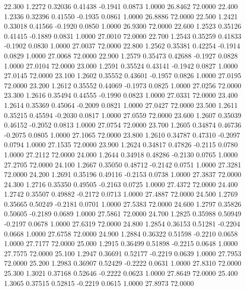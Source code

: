   22.300   1.2272   0.32036   0.41438  -0.1941   0.0873   1.0000  26.8462  72.0000
  22.400   1.2336   0.32396   0.41550  -0.1935   0.0861   1.0000  26.8886  72.0000
  22.500   1.2421   0.33018   0.41566  -0.1920   0.0850   1.0000  26.9300  72.0000
  22.600   1.2523   0.35126   0.41415  -0.1889   0.0831   1.0000  27.0010  72.0000
  22.700   1.2543   0.35259   0.41833  -0.1902   0.0830   1.0000  27.0037  72.0000
  22.800   1.2562   0.35381   0.42254  -0.1914   0.0829   1.0000  27.0068  72.0000
  22.900   1.2579   0.35473   0.42688  -0.1927   0.0828   1.0000  27.0104  72.0000
  23.000   1.2591   0.35524   0.43141  -0.1942   0.0827   1.0000  27.0145  72.0000
  23.100   1.2602   0.35552   0.43601  -0.1957   0.0826   1.0000  27.0195  72.0000
  23.200   1.2612   0.35552   0.44069  -0.1973   0.0825   1.0000  27.0256  72.0000
  23.300   1.2616   0.35494   0.44555  -0.1990   0.0823   1.0000  27.0331  72.0000
  23.400   1.2614   0.35369   0.45064  -0.2009   0.0821   1.0000  27.0427  72.0000
  23.500   1.2611   0.35215   0.45594  -0.2030   0.0817   1.0000  27.0559  72.0000
  23.600   1.2607   0.35039   0.46152  -0.2052   0.0813   1.0000  27.0754  72.0000
  23.700   1.2605   0.34874   0.46736  -0.2075   0.0805   1.0000  27.1065  72.0000
  23.800   1.2610   0.34787   0.47310  -0.2097   0.0794   1.0000  27.1535  72.0000
  23.900   1.2624   0.34817   0.47826  -0.2115   0.0780   1.0000  27.2112  72.0000
  24.000   1.2644   0.34918   0.48286  -0.2130   0.0765   1.0000  27.2705  72.0000
  24.100   1.2667   0.35050   0.48712  -0.2142   0.0751   1.0000  27.3281  72.0000
  24.200   1.2691   0.35196   0.49116  -0.2153   0.0738   1.0000  27.3837  72.0000
  24.300   1.2716   0.35350   0.49505  -0.2163   0.0725   1.0000  27.4372  72.0000
  24.400   1.2742   0.35507   0.49882  -0.2172   0.0713   1.0000  27.4887  72.0000
  24.500   1.2769   0.35665   0.50249  -0.2181   0.0701   1.0000  27.5383  72.0000
  24.600   1.2797   0.35826   0.50605  -0.2189   0.0689   1.0000  27.5861  72.0000
  24.700   1.2825   0.35988   0.50949  -0.2197   0.0678   1.0000  27.6319  72.0000
  24.800   1.2854   0.36153   0.51281  -0.2204   0.0668   1.0000  27.6758  72.0000
  24.900   1.2884   0.36322   0.51598  -0.2210   0.0658   1.0000  27.7177  72.0000
  25.000   1.2915   0.36499   0.51898  -0.2215   0.0648   1.0000  27.7575  72.0000
  25.100   1.2947   0.36691   0.52177  -0.2219   0.0639   1.0000  27.7953  72.0000
  25.200   1.2983   0.36907   0.52429  -0.2222   0.0631   1.0000  27.8310  72.0000
  25.300   1.3021   0.37168   0.52646  -0.2222   0.0623   1.0000  27.8649  72.0000
  25.400   1.3065   0.37515   0.52815  -0.2219   0.0615   1.0000  27.8973  72.0000
